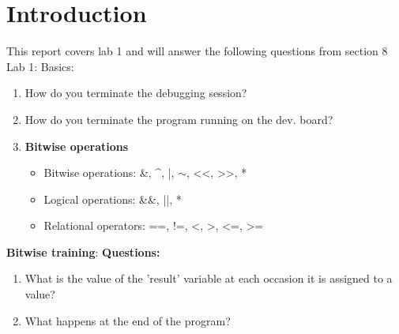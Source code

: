 \section{Introduction}
\label{section:intro}
This report covers lab 1 and will answer the following questions from section 8 Lab 1: Basics:
\begin{enumerate}
    \item How do you terminate the debugging session?
    \item How do you terminate the program running on the dev. board?
    \item \textbf{Bitwise operations}
        \begin{itemize}
            \item Bitwise operations: \&, \textasciicircum, |, $\sim$, {<}{<}, {>}{>}, *
            \item Logical operations: \&\&, ||, *
            \item Relational operators: ==, !=, <, >, <=, >=
        \end{itemize}
\end{enumerate}

\textbf{Bitwise training}:
\textbf{Questions:}
\begin{enumerate}
    \item What is the value of the 'result' variable at each occasion it is assigned to a value?
    \item What happens at the end of the program?
\end{enumerate}